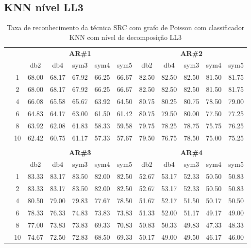 \subsection{KNN nível LL3}



\begin{table}[htpb]
	\centering
    \normalsize
	\caption{Taxa de reconhecimento da técnica SRC com grafo de Poisson com classificador KNN com nível de decomposição LL3}
	\begin{tabular}{|c|c|c c c c c|c c c c c|}
\cline{3-12}
\multicolumn{2}{c|}{\multirow{2}{*}{}} & \multicolumn{5}{c|}{\textbf{AR\#1}}  & \multicolumn{5}{c|}{\textbf{AR\#2}} \\\cline{3-12}

\multicolumn{2}{c|}{}  & db2 & db4 & sym3 & sym4 & sym5 & db2 & db4& sym3 & sym4 & sym5 \\\hline

\multicolumn{1}{|c|}{ \multirow{5}{*}{\rotatebox[origin=c]{90}{\textbf{K-vizinhos}}} }
&1	&68.00&	68.17&	67.92&	66.25&	66.67&	82.50&	82.50&	82.50&	81.50&	81.75	\\\cline{2-12}
&2	&68.00&	68.17&	67.92&	66.25&	66.67&	82.50&	82.50&	82.50&	81.50&	81.75	\\\cline{2-12}
&4	&66.08&	65.58&	65.67&	63.92&	64.50&	80.75&	80.25&	80.75&	78.50&	79.00	\\\cline{2-12}
&6	&64.83&	64.17&	63.00&	61.50&	61.42&	80.75&	79.50&	80.00&	77.50&	77.25	\\\cline{2-12}
&8	&63.92&	62.08&	61.83&	58.33&	59.58&	79.75&	78.25&	78.75&	75.75&	76.25	\\\cline{2-12}
&10	&62.42&	60.75&	61.17&	57.33&	57.67&	79.50&	76.75&	78.50&	75.00&	75.25	\\ \midrule
\multicolumn{12}{c}{}\\ 




\cline{3-12}
\multicolumn{2}{c}{} & \multicolumn{5}{|c|}{\textbf{AR\#3}}  & \multicolumn{5}{c|}{\textbf{AR\#4}} \\\cline{3-12}
\multicolumn{2}{c}{}  & \multicolumn{1}{|c}{db2} & db4 & sym3 & sym4 & sym5 & db2 & db4& sym3 & sym4 & sym5 \\\hline
\multicolumn{1}{|c|}{ \multirow{6}{*}{\rotatebox[origin=c]{90}{\textbf{K-vizinhos}}} }
&1	&83.33&	83.17&	83.50&	82.00&	82.50&	52.67&	53.17&	52.33&	50.50&	50.83	\\\cline{2-12}
&2	&83.33&	83.17&	83.50&	82.00&	82.50&	52.67&	53.17&	52.33&	50.50&	50.83	\\\cline{2-12}
&4	&80.50&	79.00&	79.83&	77.67&	78.50&	51.67&	52.17&	51.50&	50.17&	50.50	\\\cline{2-12}
&6	&78.33&	76.33&	74.83&	73.83&	73.83&	51.33&	52.00&	51.17&	49.17&	49.00	\\\cline{2-12}
&8	&77.00&	73.83&	73.83&	69.33&	70.83&	50.83&	50.33&	49.83&	47.33&	48.33	\\\cline{2-12}
&10	&74.67&	72.50&	72.83&	68.50&	69.33&	50.17&	49.00&	49.50&	46.17&	46.00	
\\\midrule
\end{tabular}


\end{table}
